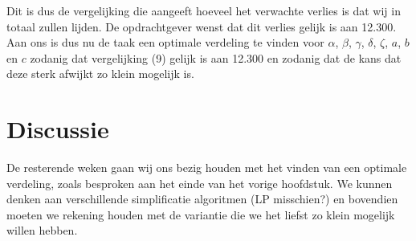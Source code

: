 \documentclass[a4paper, oneside, book]{memoir}
\begin{document}
Dit is dus de vergelijking die aangeeft hoeveel het verwachte verlies is dat wij in totaal zullen lijden. De opdrachtgever wenst dat dit verlies gelijk is aan 12.300. Aan ons is dus nu de taak een optimale verdeling te vinden voor $\alpha$, $\beta$, $\gamma$, $\delta$, $\zeta$, $a$, $b$ en $c$ zodanig dat vergelijking (9) gelijk is aan 12.300 en zodanig dat de kans dat deze sterk afwijkt zo klein mogelijk is.

\chapter*{Discussie}

De resterende weken gaan wij ons bezig houden met het vinden van een optimale verdeling, zoals besproken aan het einde van het vorige hoofdstuk. We kunnen denken aan verschillende simplificatie algoritmen (LP misschien?) en bovendien moeten we rekening houden met de variantie die we het liefst zo klein mogelijk willen hebben.
\end{document}
